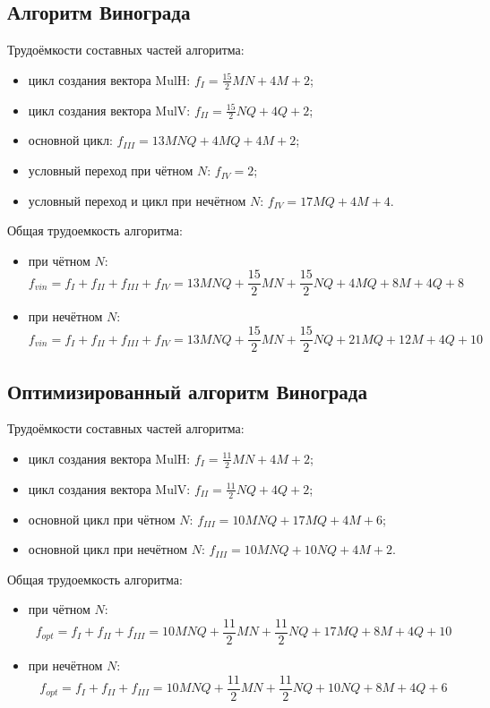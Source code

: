 \documentclass[12pt, a4paper]{report}
\begin{document}
	\subsection{Алгоритм Винограда}
	Трудоёмкости составных частей алгоритма:
	\begin{itemize}
		\item цикл создания вектора MulH: $f_{I} = \frac{15}{2}MN + 4M + 2$;
		\item цикл создания вектора MulV:  $f_{II} = \frac{15}{2}NQ + 4Q + 2$;
		\item основной цикл: $f_{III} = 13MNQ + 4MQ + 4M + 2$;
		\item условный переход при чётном $N$: $f_{IV} = 2$;
		\item условный переход и цикл при нечётном $N$: $f_{IV} = 17MQ + 4M + 4$.
	\end{itemize}
	Общая трудоемкость алгоритма:
	\begin{itemize}
		\item при чётном $N$:
		\begin{equation}
		\label{complex_vin_even}
		f_{vin} = f_{I} + f_{II} + f_{III} + f_{IV} = 13MNQ + \frac{15}{2}MN + \frac{15}{2}NQ + 4MQ + 8M + 4Q + 8
		\end{equation}
		\item при нечётном $N$:
		\begin{equation}
		\label{complex_vin_odd}
		f_{vin} = f_{I} + f_{II} + f_{III} + f_{IV} = 13MNQ + \frac{15}{2}MN + \frac{15}{2}NQ + 21MQ + 12M + 4Q + 10
		\end{equation}
	\end{itemize}
	
	\subsection{Оптимизированный алгоритм Винограда}
	Трудоёмкости составных частей алгоритма:
	\begin{itemize}
		\item цикл создания вектора MulH: $f_{I} = \frac{11}{2}MN + 4M + 2$;
		\item цикл создания вектора MulV:  $f_{II} = \frac{11}{2}NQ + 4Q + 2$;
		\item основной цикл при чётном $N$: $f_{III} = 10MNQ + 17MQ + 4M + 6$;
		\item основной цикл при нечётном $N$: $f_{III} = 10MNQ + 10NQ + 4M + 2$.
	\end{itemize}
	Общая трудоемкость алгоритма:
	\begin{itemize}
		\item при чётном $N$:
		\begin{equation}
		\label{complex_vin_even}
		f_{opt} = f_{I} + f_{II} + f_{III} = 10MNQ + \frac{11}{2}MN + \frac{11}{2}NQ + 17MQ + 8M + 4Q + 10
		\end{equation}
		\item при нечётном $N$:
		\begin{equation}
		\label{complex_vin_odd}
		f_{opt} = f_{I} + f_{II} + f_{III} = 10MNQ + \frac{11}{2}MN + \frac{11}{2}NQ + 10NQ + 8M + 4Q + 6
		\end{equation}
	\end{itemize}
\end{document}
